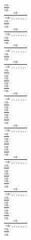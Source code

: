 \documentclass[11pt]{article}
\begin{document}
\begin{center}
\bigskip
\\$\frac{\Rightarrow }{\Rightarrow }$
\bigskip
\\$\frac{\Rightarrow }{\Rightarrow , , , , , , , }$
\bigskip
\\$\frac{\Rightarrow }{\Rightarrow }$
\bigskip
\\$\frac{\Rightarrow }{\Rightarrow , , , , , , , }$
\bigskip
\\$\frac{\Rightarrow }{\Rightarrow }$
\bigskip
\\$\frac{\Rightarrow }{\Rightarrow , , , , , , , }$
\bigskip
\\$\frac{\Rightarrow }{\Rightarrow }$
\bigskip
\\$\frac{\Rightarrow }{\Rightarrow , , , , , , , }$
\bigskip
\\$\frac{\Rightarrow }{\Rightarrow }$
\bigskip
\\$\frac{\Rightarrow }{\Rightarrow }$
\bigskip
\\$\frac{\Rightarrow }{\Rightarrow }$
\bigskip
\\$\frac{\Rightarrow }{\Rightarrow , , , , , , , }$
\bigskip
\\$\frac{\Rightarrow }{\Rightarrow }$
\bigskip
\\$\frac{\Rightarrow }{\Rightarrow }$
\bigskip
\\$\frac{\Rightarrow }{\Rightarrow }$
\bigskip
\\$\frac{\Rightarrow }{\Rightarrow , , , , , , , }$
\bigskip
\\$\frac{\Rightarrow }{\Rightarrow }$
\bigskip
\\$\frac{\Rightarrow }{\Rightarrow }$
\bigskip
\\$\frac{\Rightarrow }{\Rightarrow }$
\bigskip
\\$\frac{\Rightarrow }{\Rightarrow , , , , , , , }$
\bigskip
\\$\frac{\Rightarrow }{\Rightarrow }$
\bigskip
\\$\frac{\Rightarrow }{\Rightarrow }$
\bigskip
\\$\frac{\Rightarrow }{\Rightarrow }$
\bigskip
\\$\frac{\Rightarrow }{\Rightarrow , , , , , , , }$
\bigskip
\\$\frac{\Rightarrow }{\Rightarrow }$
\bigskip
\\$\frac{\Rightarrow }{\Rightarrow }$
\bigskip
\\$\frac{\Rightarrow }{\Rightarrow }$
\bigskip
\\$\frac{\Rightarrow }{\Rightarrow , , , , , , , }$
\bigskip
\\$\frac{\Rightarrow }{\Rightarrow }$

\end{center}
\end{document}
